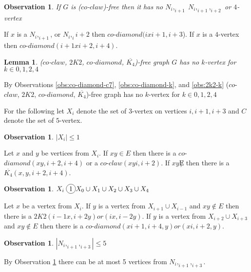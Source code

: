 \documentclass[12pt]{article}
\newcommand*\circled[1]{\tikz[baseline=(char.base)]{
            \node[shape=circle,draw,inner sep=2pt] (char) {#1};}}
\newtheorem{Lemma}[Theorem]{Lemma}
\newtheorem{Observation}[Theorem]{Observation}
\def\FAMILY{($co$-$claw$, $2K2$, $co$-$diamond$, $\overline{K_4}$)}
\begin{document}
\begin{Observation}\label{obs:co-claw-k}
If $G$ is ($co$-$claw$)-free then it has no $N_i,_{i+1}\; N_i,_{i+1},_{i+2}$ or $4$-vertex
\end{Observation}
 If $x$ is a $N_i,_{i+1}$, or $N_i,_i{i+2}$ then $co$-$diamond (ixi+1, i+3$). If $x$ is a $4$-vertex then $co$-$diamond (i+1xi+2, i+4)$.

\begin{Lemma}\label{lem:k-c5}
{\FAMILY}-free graph $G$ has no $k$-vertex for $k \in {0, 1, 2, 4}$
\end{Lemma}
 By Observations \ref{obs:co-diamond-c7}, \ref{obs:co-diamond-k}, and \ref{obs:2k2-k} {\FAMILY}-free graph has no $k$-vertex for $k \in {0, 1, 2, 4}$

For the following let $X_i$ denote the set of $3$-vertex on vertices $i,i+1,i+3$ and $C$ denote the set of $5$-vertex.

\begin{Observation}\label{obs:one-xi}
$|X_i| \leq 1$
\end{Observation}
 Let $x$ and $y$ be vertices from $X_i$. If $xy \in E$ then there is a $co$-$diamond (xy, i+2, i+4)$ or a $co$-$claw(xyi, i+2)$. If $xy \not E$ then there is a $\overline{K_4}(x, y, i+2, i+4)$.

\begin{Observation}\label{obs:xi-clique}
$X_i\; \circled{1} X_0 \cup X_1 \cup X_2 \cup X_3 \cup X_4$ 
\end{Observation}
 Let $x$ be a vertex from $X_i$. If $y$ is a vertex from $X_{i+1} \cup X_{i-1}$ and $xy \not \in E$ then there is a $2K2 (i-1x, i+2y) or (ix, i-2y)$. If $y$ is a vertex from $X_{i+2} \cup X_{i+3}$ and $xy \not \in E$ then there is a $co$-$diamond (xi+1, i+4, y) or (xi, i+2, y)$.

\begin{Observation}\label{obs:xi-not-max}
$|N_i,_{i+1},_{i+3}| \leq 5$
\end{Observation}
 By Observation \ref{obs:one-xi} there can be at most 5 vertices from $N_i,_{i+1},_{i+3}$.
\end{document}
